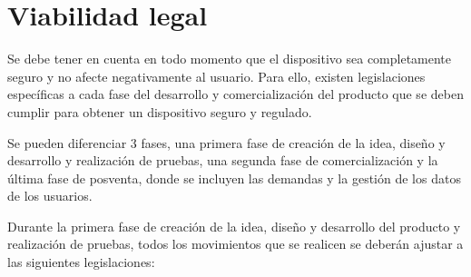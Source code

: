 \section{Viabilidad legal}

Se debe tener en cuenta en todo momento que el dispositivo sea completamente seguro y no afecte negativamente al usuario. Para ello, existen legislaciones específicas a cada fase del desarrollo y comercialización del producto que se deben cumplir para obtener un dispositivo seguro y regulado.

Se pueden diferenciar 3 fases, una primera fase de creación de la idea, diseño y desarrollo y realización de pruebas, una segunda fase de comercialización y la última fase de posventa, donde se incluyen las demandas y la gestión de los datos de los usuarios.

Durante la primera fase de creación de la idea, diseño y desarrollo del producto y realización de pruebas, todos los movimientos que se realicen se deberán ajustar a las siguientes legislaciones:
